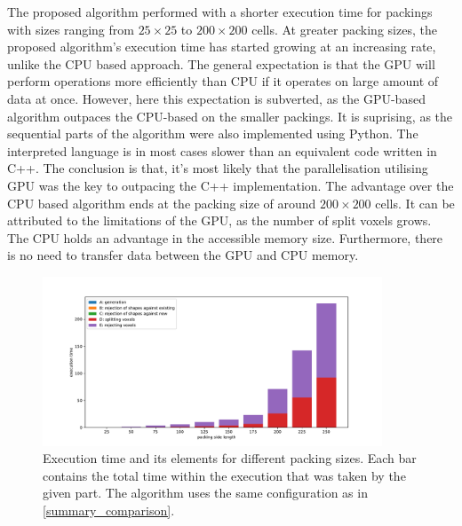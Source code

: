 \documentclass[12pt, oneside]{report}
\begin{document}
The proposed algorithm performed with a shorter execution time for packings with sizes ranging from $25 \times 25$ to $200 \times 200$ cells. At greater packing sizes, the proposed algorithm's execution time has started growing at an increasing rate, unlike the CPU based approach. \newline
The general expectation is that the GPU will perform operations more efficiently than CPU if it operates on large amount of data at once. However, here this expectation is subverted, as the GPU-based algorithm outpaces the CPU-based on the smaller packings. It is suprising, as the sequential parts of the algorithm were also implemented using Python. The interpreted language is in most cases slower than an equivalent code written in C++. The conclusion is that, it's most likely that the parallelisation utilising GPU was the key to outpacing the C++ implementation.\newline
The advantage over the CPU based algorithm ends at the packing size of around $200 \times 200$ cells. It can be attributed to the limitations of the GPU, as the number of split voxels grows. The CPU holds an advantage in the accessible memory size. Furthermore, there is no need to transfer data between the GPU and CPU memory.

\begin{figure}[H]
  \centering
	\includegraphics[width=0.9\textwidth,keepaspectratio]{Images/SummaryComparison/parts_total.pdf}
	\caption{Execution time and its elements for different packing sizes. Each bar contains the total time within the execution that was taken by the given part. The algorithm uses the same configuration as in \ref{summary_comparison}. }
	\label{summary_times_total}
\end{figure}
\end{document}
